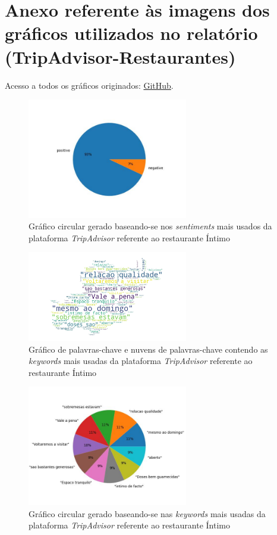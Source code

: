 \chapter{Anexo referente às imagens dos gráficos utilizados no relatório (TripAdvisor-Restaurantes)}
\label{an2}

Acesso a todos os gráficos originados: \href{https://github.com/CatKinKitKat/pi2021/tree/master/projecto/datascience/graphs/TripAdvisor/restaurants}{GitHub}.

\begin{figure}[!htb]
\centering
\includegraphics[width=7cm]{figuras/TripAdvisor/Restaurants/restaurant0_sentiments.jpeg}
\caption{Gráfico circular gerado baseando-se nos \textit{sentiments} mais usados da plataforma \textit{TripAdvisor} referente ao restaurante Íntimo}
\label{fig:exemplofig}
\end{figure}

\begin{figure}[!htb]
\centering
\includegraphics[width=7cm]{figuras/TripAdvisor/Restaurants/restaurant0_keywordcloud.jpeg}
\caption{Gráfico de palavras-chave e nuvens de palavras-chave contendo as \textit{keywords} mais usadas da plataforma \textit{TripAdvisor} referente ao restaurante Íntimo}
\label{fig:exemplofig}
\end{figure}

\begin{figure}[!htb]
\centering
\includegraphics[width=7cm]{figuras/TripAdvisor/Restaurants/restaurant0_keywords.jpeg}
\caption{Gráfico circular gerado baseando-se nas \textit{keywords} mais usadas da plataforma \textit{TripAdvisor} referente ao restaurante Íntimo}
\label{fig:exemplofig}
\end{figure}

